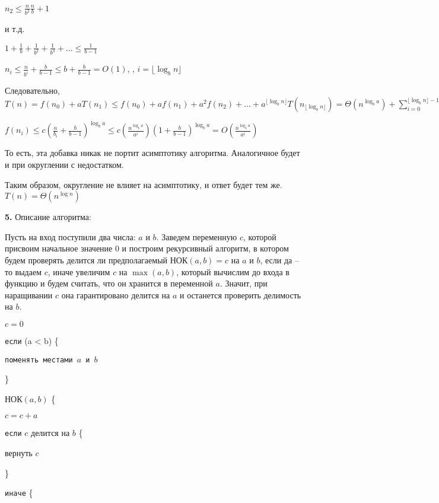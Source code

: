 \documentclass[12pt]{extreport}
\begin{document}
$n_2 \leq \frac{n}{b^2}  \frac{n}{b} + 1 $ 

и т.д. 

$1 + \frac{1}{b} + \frac{1}{b^2} + \frac{1}{b^3} + ... \leq \frac{1}{b-1} $

$n_i \leq \frac{n}{b^i} + \frac{b}{b-1} \leq b + \frac{b}{b-1} = O(1) $, , $i = \lfloor \log_{b}{n} \rfloor$

Следовательно, $T(n) = f(n_0) + aT(n_1) \leq f(n_0) + af(n_1) + a^2f(n_2) + ... + a^{\lfloor \log_{b}{n} \rfloor} T(n_{\lfloor \log_{b}{n} \rfloor}) = \Theta(n^{\log_{b} {a}}) + \sum \limits_{i=0}^{\lfloor \log_{b}{n} \rfloor-1} a^i f(n_i)$

$f(n_i) \leq c(\frac{n}{b_i} + \frac{b}{b-1})^{\log_{b}{a}} \leq c (\frac{n^{\log_{b}{a}}}{a^i})(1 + \frac{b}{b-1})^{\log_{b}{a}} = O(\frac{n^{\log_{b}{a}}}{a^i})$

То есть, эта добавка никак не портит асимптотику алгоритма. Аналогичное будет и при округлении с недостатком. 

Таким образом, округление не влияет на асимптотику, и ответ будет тем же. $T(n) = \Theta(n^{\log n})$

\bigskip
{\bf 5.} Описание алгоритма: 

Пусть на вход поступили два числа: $a$ и $b$. Заведем переменную $c$, которой присвоим начальное значение $0$ и построим рекурсивный алгоритм, в котором будем проверять делится ли предполагаемый  НОК$(a, b) = c$ на $a$ и $b$, если да -- то выдаем $c$, иначе увеличим $c$ на $\max(a, b)$, который вычислим до входа в функцию и будем считать, что он хранится в переменной $a$. Значит, при наращивании $c$ она гарантировано делится на $a$ и останется проверить делимость на $b$.

$c = 0$

{ \tt если} (a < b) \{

\hspace{4 mm} {\tt поменять местами $a$ и $b$}

\}

НОК$(a, b)$ \{

	\hspace{4 mm} $c = c + a$
	
	\hspace{4 mm} { \tt если} $c$ делится на $b$ \{
	
	\hspace{8 mm} вернуть $c$
	
	\hspace{4 mm} \}
	
	{ \tt иначе} \{
	
\end{document}
